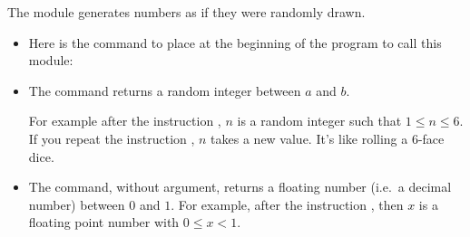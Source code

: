 \documentclass[11pt,class=report,crop=false]{standalone}
\begin{document}
\begin{cours}


The  module generates numbers as if they were randomly drawn.
\begin{itemize}
  \item Here is the command to place at the beginning of the program to call this module:
  
  \item The  command returns a random integer between $a$ and $b$.
  
  For example after the instruction , $n$ is a random integer such that $1 \le n \le 6$.
  If you repeat the instruction , $n$ takes a new value. It's like rolling a 6-face dice.
  
  \item The  command, without argument, returns a floating number (i.e.~a decimal number) between $0$ and $1$.  
  For example, after the instruction , then $x$ is a floating point number with $0 \le x < 1$.
\end{itemize}


\end{cours}


\end{document}

